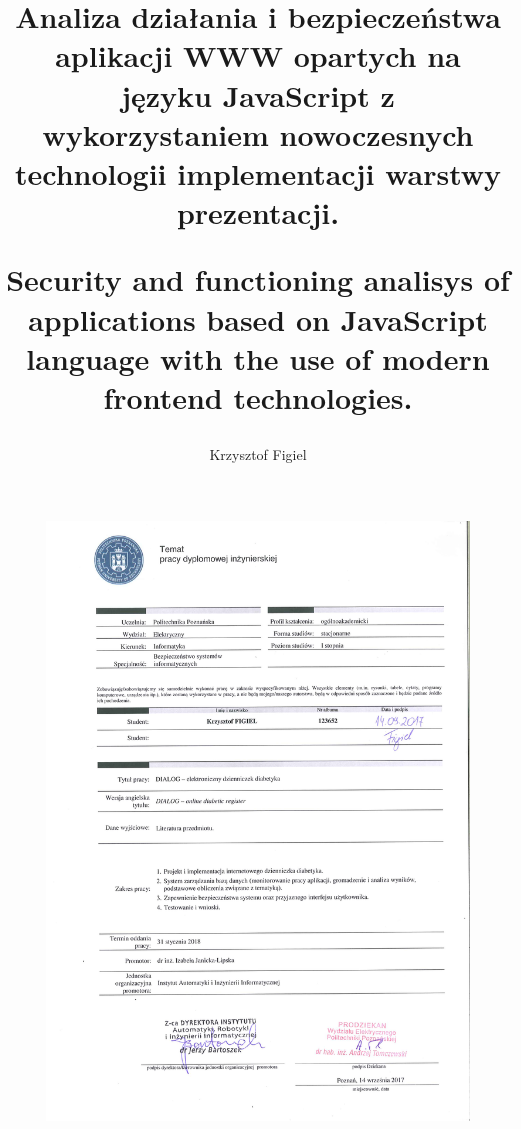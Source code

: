 \documentclass[polish,a4paper,twoside,bachelor, 10pt]{ppfcmthesis}
\author{Krzysztof Figiel}                              %
\title{Analiza działania i bezpieczeństwa aplikacji WWW opartych na języku JavaScript z wykorzystaniem nowoczesnych technologii implementacji warstwy prezentacji.

Security and functioning analisys of applications based on JavaScript language with the use of modern frontend technologies.}                   %
\begin{document}
\frontmatter\pagestyle{empty}%
\maketitle\cleardoublepage%

\thispagestyle{empty}\vspace*{\fill}%
\begin{center}
	\begin{figure}[h]
		\centering\includegraphics[angle=270, scale=0.73]{images/karta_pracy.jpg}
	\end{figure}
\end{center}%
\vfill\cleardoublepage%


\vfill\cleardoublepage%

\pagestyle{ppfcmthesis}%
\tableofcontents* \cleardoublepage%

\mainmatter%













{\raggedright\small}

\cleardoublepage\appendix%

\end{document}
